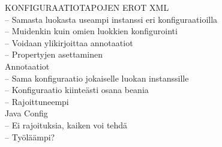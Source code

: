 \documentclass[hyperref={pdfauthor=\AUTHOR},14pt]{beamer}
\begin{document}
\begin{frame}[t, fragile]{KONFIGURAATIOTAPOJEN EROT}
XML\\
\scriptsize
 -- Samasta luokasta useampi instanssi eri konfiguraatioilla\\
 -- Muidenkin kuin omien luokkien konfigurointi\\
 -- Voidaan ylikirjoittaa annotaatiot\\
 -- Propertyjen asettaminen\\

\large Annotaatiot\\
\scriptsize
 -- Sama konfiguraatio jokaiselle luokan instanssille\\
 -- Konfiguraatio kiinteästi osana beania\\
 -- Rajoittuneempi\\

\normalsize Java Config\\
\scriptsize
 -- Ei rajoituksia, kaiken voi tehdä\\
 -- Työläämpi?\\
\end{frame}
\end{document}
